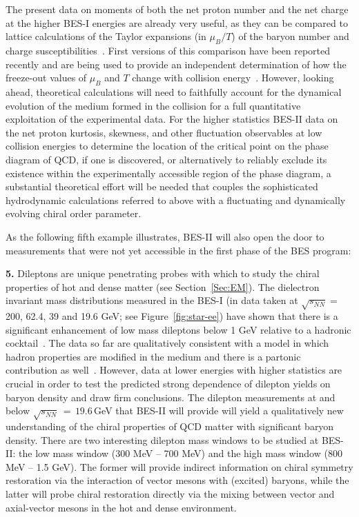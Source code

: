 The present data on moments of both the net proton number and the 
net charge at the higher BES-I energies are already very useful, as
they can be compared to lattice calculations of the Taylor expansions 
(in $\mu_B/T$) of the baryon number and charge susceptibilities~\cite{Karsch:2012wm}. 
First versions of this comparison have been
reported recently and are being used to provide an independent
determination of how the freeze-out values of $\mu_B$ and $T$ change
with collision energy~\cite{Bazavov:2012vg,Mukherjee:2013lsa,Borsanyi:2013hza,Borsanyi:2014ewa}. 
However, looking ahead, theoretical 
calculations will need to faithfully
account for the dynamical evolution of the medium formed in the
collision for a full quantitative exploitation of the experimental
data. For the higher statistics BES-II data on the net proton
kurtosis, skewness, and other fluctuation observables at low collision
energies to determine the location of the critical point on the phase
diagram of QCD, if one is discovered, or alternatively to reliably exclude its
existence within the experimentally accessible region of the phase
diagram, a substantial theoretical effort will be needed that couples
the sophisticated hydrodynamic calculations referred to above with a
fluctuating and dynamically evolving chiral  order parameter.

As the following fifth example illustrates, BES-II will also open the
door to measurements that were not yet accessible in the first phase
of the BES program:


{\bf 5.} Dileptons are unique penetrating probes with which to study
the chiral properties of hot and dense matter (see Section~\ref{Sec:EM}). The dielectron
invariant mass distributions measured in the BES-I (in data taken at
$\sqrt{s_{NN}}=$ 200, 62.4, 39 and 19.6 GeV; see Figure~\ref{fig:star-ee}) have shown that there is
a significant enhancement of low mass dileptons below 1 GeV relative
to a hadronic cocktail~\cite{Huck:2014mfa}. The data so far are qualitatively
consistent with a model in which hadron properties are modified in the
medium and there is a partonic contribution as
well~\cite{Rapp:2009yu}. However, data at lower energies with higher
statistics are crucial in order to test the predicted strong
dependence of dilepton yields on baryon density and draw firm
conclusions. The dilepton measurements at and below
$\sqrt{s_{NN}}{\,=\,}19.6$\,GeV that BES-II will provide will yield a
qualitatively new understanding of the chiral properties of QCD matter
with significant baryon density. There are two interesting dilepton
mass windows to be studied at BES-II: the low mass window (300 MeV --
700 MeV) and the high mass window (800 MeV -- 1.5 GeV). The former
will provide indirect information on chiral symmetry restoration via
the interaction of vector mesons with (excited) baryons, while the
latter will probe chiral restoration directly via the mixing between
vector and axial-vector mesons in the hot and dense environment.

